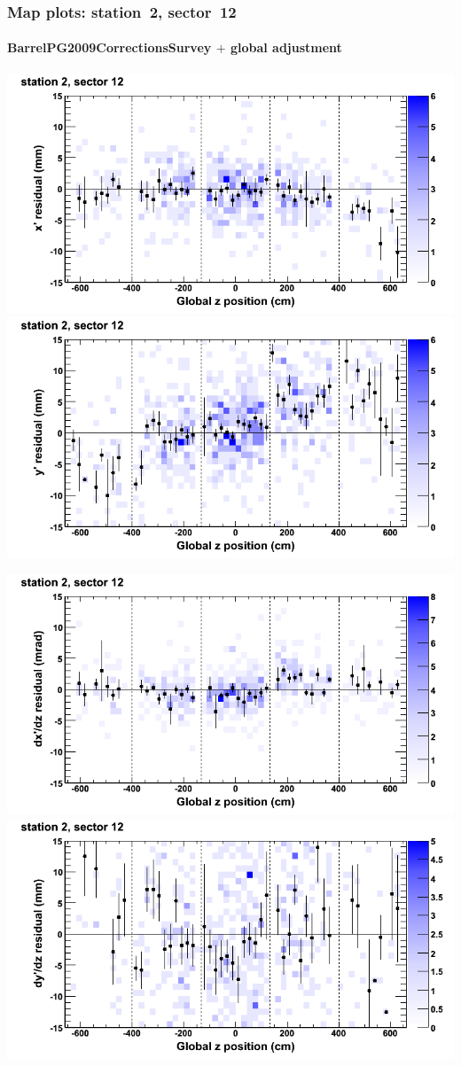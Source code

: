 \documentclass[compress]{beamer}
\begin{document}
\begin{frame}
\frametitle{Map plots: station~2, sector~12}
\framesubtitle{BarrelPG2009CorrectionsSurvey $+$ global adjustment}
\includegraphics[width=0.5\linewidth]{mapplots_re01/DTvsz_st2sec12_x.png}
\includegraphics[width=0.5\linewidth]{mapplots_re01/DTvsz_st2sec12_y.png}

\includegraphics[width=0.5\linewidth]{mapplots_re01/DTvsz_st2sec12_dxdz.png}
\includegraphics[width=0.5\linewidth]{mapplots_re01/DTvsz_st2sec12_dydz.png}
\end{frame}
\end{document}
